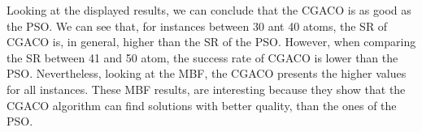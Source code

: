 		Looking at the displayed results, we can conclude that the CGACO is as good as the PSO. We can see that, for instances between 30 ant 40 atoms, the SR of CGACO is, in general, higher than the SR of the PSO. However, when comparing the SR between 41 and 50 atom, the success rate of CGACO is lower than the PSO. Nevertheless, looking at the MBF, the CGACO presents the higher values for all instances. These MBF results, are interesting because they show that the CGACO algorithm can find solutions with better quality, than the ones of the PSO.
	
	
	
	
	
	
	
	
	

	
